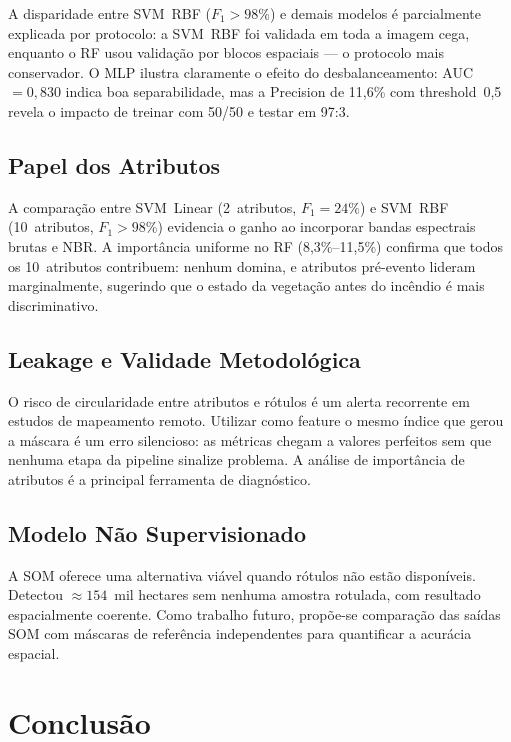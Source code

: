 \documentclass[conference]{IEEEtran}
\begin{document}
A disparidade entre SVM~RBF ($F_1 > 98\%$) e demais modelos é parcialmente
explicada por protocolo: a SVM~RBF foi validada em toda a imagem cega,
enquanto o RF usou validação por blocos espaciais — o protocolo mais
conservador. O MLP ilustra claramente o efeito do desbalanceamento:
AUC~$= 0{,}830$ indica boa separabilidade, mas a Precision de 11,6\% com
threshold~0,5 revela o impacto de treinar com 50/50 e testar em 97:3.

\subsection{Papel dos Atributos}

A comparação entre SVM~Linear (2~atributos, $F_1 = 24\%$) e SVM~RBF
(10~atributos, $F_1 > 98\%$) evidencia o ganho ao incorporar bandas
espectrais brutas e NBR. A importância uniforme no RF (8,3\%--11,5\%)
confirma que todos os 10~atributos contribuem: nenhum domina, e atributos
pré-evento lideram marginalmente, sugerindo que o estado da vegetação
antes do incêndio é mais discriminativo.

\subsection{Leakage e Validade Metodológica}

O risco de circularidade entre atributos e rótulos é um alerta recorrente
em estudos de mapeamento remoto. Utilizar como feature o mesmo índice que
gerou a máscara é um erro silencioso: as métricas chegam a valores
perfeitos sem que nenhuma etapa da pipeline sinalize problema. A análise
de importância de atributos é a principal ferramenta de diagnóstico.

\subsection{Modelo Não Supervisionado}

A SOM oferece uma alternativa viável quando rótulos não estão disponíveis.
Detectou $\approx154$~mil hectares sem nenhuma amostra rotulada, com
resultado espacialmente coerente. Como trabalho futuro, propõe-se comparação
das saídas SOM com máscaras de referência independentes para quantificar
a acurácia espacial.

\section{Conclusão}
\end{document}
